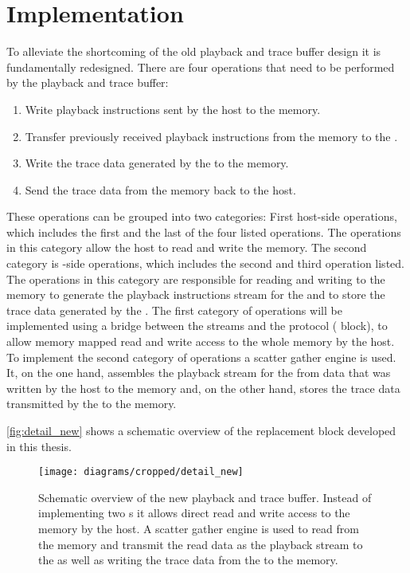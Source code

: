 \section{Implementation}\label{sec:impl}
To alleviate the shortcoming of the old playback and trace buffer design it is fundamentally redesigned.
There are four operations that need to be performed by the playback and trace buffer:
\begin{enumerate}
  \item Write playback instructions sent by the host to the \DDR{} memory.
  \item Transfer previously received playback instructions from the \DDR{} memory to the \pbexec{}.
  \item Write the trace data generated by the \pbexec{} to the \DDR{} memory.
  \item Send the trace data from the \DDR{} memory back to the host.
\end{enumerate}
These operations can be grouped into two categories: First host-side operations, which includes the first and the last of the four listed operations. The operations in this category allow the host to read and write the \DDR{} memory.
The second category is \FPGA{}-side operations, which includes the second and third operation listed. The operations in this category are responsible for reading and writing to the \DDR{} memory to generate the playback instructions stream for the \pbexec{} and to store the trace data generated by the \pbexec{}.
The first category of operations will be implemented using a bridge between the \HostARQ{} streams and the \AXI{} protocol (\FAXI{} block),  to allow memory mapped read and write access to the whole \DDR{} memory by the host.
To implement the second category of operations a scatter gather \DMA{} engine is used. It, on the one hand, assembles the playback stream for the \pbexec{} from data that was written by the host to the \DDR{} memory and, on the other hand, stores the trace data transmitted by the \pbexec{} to the \DDR{} memory.

\autoref{fig:detail_new} shows a schematic overview of the replacement block developed in this thesis.

\begin{figure}[htbp]
\centerline{\texttt{[image: diagrams/cropped/detail\_new]}}
\caption{Schematic overview of the new playback and trace buffer. Instead of implementing two \FIFO{}s it allows direct read and write access to the \DDR{} memory by the host. A scatter gather \DMA{} engine is used to read from the \DDR{} memory and transmit the read data as the playback stream to the \pbexec{} as well as writing the trace data from the \pbexec{} to the \DDR{} memory.}\label{fig:detail_new}
\end{figure}

